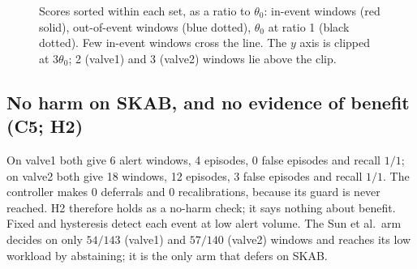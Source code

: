 \begin{figure}[tbp]
  \centering
  \resizebox{0.88\linewidth}{!}{}
  \caption{Scores sorted within each set, as a ratio to $\theta_0$: in-event windows (red
  solid), out-of-event windows (blue dotted), $\theta_0$ at ratio 1 (black dotted). Few
  in-event windows cross the line. The $y$ axis is clipped at $3\theta_0$; 2 (valve1) and
  3 (valve2) windows lie above the clip.}
  \label{fig:scorer-limit}
\end{figure}

\subsection{No harm on SKAB, and no evidence of benefit (C5; H2)}\label{sec:results-baseline}
On valve1 both give 6 alert windows, 4 episodes, 0 false episodes and recall $1/1$; on
valve2 both give 18 windows, 12 episodes, 3 false episodes and recall $1/1$. The
controller makes 0 deferrals and 0 recalibrations, because its guard is never reached.
H2 therefore holds as a no-harm check; it says nothing about benefit. Fixed and
hysteresis detect each event at low alert volume. The Sun et al.\ arm decides on only
$54/143$ (valve1) and $57/140$ (valve2) windows and reaches its low workload by
abstaining; it is the only arm that defers on SKAB.

\begin{table}[tbp]
  \centering
  \caption{All 11 arms on the two SKAB development streams, one common score trace per
  stream. Recall and coverage are shown as num/den. Calibration threshold $\theta_0$:
  valve1 $1.309$ (43 windows), valve2 $1.126$ (40 windows). ``In-ev.\ alert'' is the
  in-event alerted fraction; ``--'' marks an undefined value (mean delay when an arm
  raises no in-event alert).}
  \label{tab:baseline}
  \scriptsize
  \setlength{\tabcolsep}{3.2pt}
  
\end{table}

